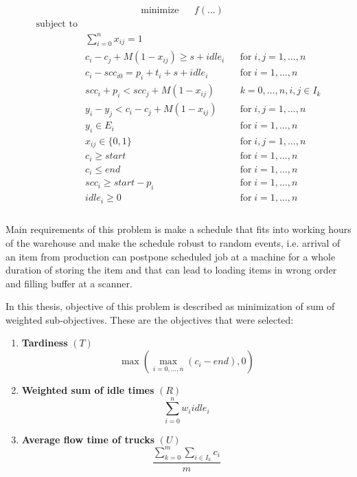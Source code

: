 \documentclass{ctuthesis}
\begin{document}
\begin{equation}
\begin{aligned}
&\text{minimize}
&&f(\ldots)
\end{aligned}
\end{equation}
\begin{equation}
\begin{aligned}
\text{subject to}\\
& \sum_{i=0}^{n} x_{ij} = 1 &&\\
& c_{i} - c_{j} + M(1 - x_{ij}) \geq s + idle_{i} && \text{for}\; i,j = 1, \ldots, n\\
& c_{i} - scc_{i0} = p_{i} + t_i + s + idle_i && \text{for}\; i = 1, \ldots, n\\
& scc_{i} + p_i < scc_j + M(1 - x_{ij}) && k = 0,\ldots,n, i,j \in I_k\\
& y_{i} - y_{j} < c_i - c_j + M(1 - x_{ij}) && \text{for}\; i,j = 1, \ldots, n\\
& y_i \in E_i && \text{for}\; i = 1, \ldots, n\\
& x_{ij} \in \{0, 1\}  && \text{for}\; i,j = 1, \ldots, n\\ 
& c_i \geq start && \text{for}\; i = 1, \ldots, n\\
& c_i \leq end && \text{for}\; i = 1, \ldots, n\\
& scc_{i} \geq start - p_i && \text{for}\; i = 1, \ldots, n\\
& idle_i \geq 0 && \text{for}\; i = 1, \ldots, n\\
\end{aligned}
\end{equation}
\\

Main requirements of this problem is make a schedule that fits into working hours of the warehouse and make the schedule robust to random events, i.e. arrival of an item from production can postpone scheduled job at a machine for a whole duration of storing the item and that can lead to loading items in wrong order and filling buffer at a scanner. 

In this thesis, objective of this problem is described as minimization of sum of weighted sub-objectives. These are the objectives that were selected:
\begin{enumerate}
\item \textbf{Tardiness} $(T)$\\ \begin{equation}\max(\max_{i=0,\ldots,n}( c_i - end), 0)\end{equation}
\item \textbf{Weighted sum of idle times} $(R)$\\ 
\begin{equation}
    \sum_{i=0}^{n} w_iidle_i
\end{equation}
\item \textbf{Average flow time of trucks} $(U)$
\begin{equation} 
    \dfrac{\sum_{k=0}^{m} \sum_{i \in I_k} c_i}{m}
\end{equation}
\end{enumerate}
\end{document}

